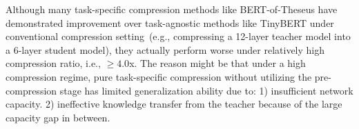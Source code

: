 	Although many task-specific compression methods like BERT-of-Theseus have demonstrated improvement over task-agnostic methods like TinyBERT under conventional compression setting~(e.g., compressing a 12-layer teacher model into a 6-layer student model), they actually perform worse under relatively high compression ratio, i.e., $\ge4.0$x. The reason might be that under a high compression regime, pure task-specific compression without utilizing the pre-compression stage has limited generalization ability due to: 1) insufficient network capacity. 2) ineffective knowledge transfer from the teacher because of the large capacity gap in between.
%

